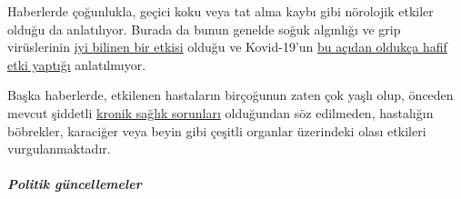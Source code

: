 Haberlerde çoğunlukla, geçici koku veya tat alma kaybı gibi nörolojik
etkiler olduğu da anlatılıyor. Burada da bunun genelde soğuk algınlığı
ve grip virüslerinin
\href{https://www.ncbi.nlm.nih.gov/pubmed/25294743}{iyi bilinen bir
etkisi} olduğu ve Kovid-19'un
\href{https://www.ncbi.nlm.nih.gov/pubmed/23948436}{bu açıdan oldukça
hafif etki yaptığı} anlatılmıyor.

Başka haberlerde, etkilenen hastaların birçoğunun zaten çok yaşlı olup,
önceden mevcut şiddetli
\href{https://www.epicentro.iss.it/coronavirus/sars-cov-2-decessi-italia}{kronik
sağlık sorunları} olduğundan söz edilmeden, hastalığın böbrekler,
karaciğer veya beyin gibi çeşitli organlar üzerindeki olası etkileri
vurgulanmaktadır.

\hypertarget{politik-guxfcncellemeler-1}{%
\subparagraph{\texorpdfstring{\textbf{Politik
güncellemeler}}{Politik güncellemeler}}\label{politik-guxfcncellemeler-1}}

